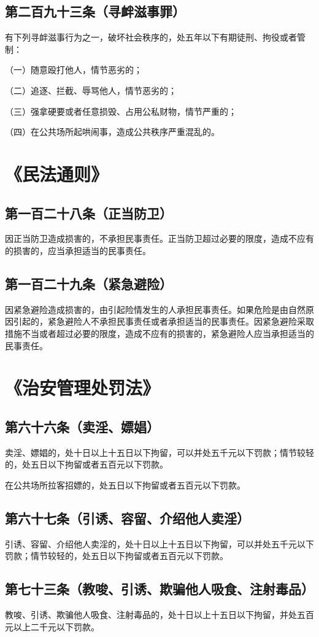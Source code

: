 \documentclass[utf-8,10pt]{ctexart}
\begin{document}
\subsection{第二百九十三条（寻衅滋事罪）}
有下列寻衅滋事行为之一，破坏社会秩序的，处五年以下有期徒刑、拘役或者管制：

（一）随意殴打他人，情节恶劣的；

（二）追逐、拦截、辱骂他人，情节恶劣的；

（三）强拿硬要或者任意损毁、占用公私财物，情节严重的；

（四）在公共场所起哄闹事，造成公共秩序严重混乱的。
\section{《民法通则》}
\subsection{第一百二十八条（正当防卫）}
因正当防卫造成损害的，不承担民事责任。正当防卫超过必要的限度，造成不应有的损害的，应当承担适当的民事责任。
\subsection{第一百二十九条（紧急避险）}
因紧急避险造成损害的，由引起险情发生的人承担民事责任。如果危险是由自然原因引起的，紧急避险人不承担民事责任或者承担适当的民事责任。因紧急避险采取措施不当或者超过必要的限度，造成不应有的损害的，紧急避险人应当承担适当的民事责任。
\section{《治安管理处罚法》}
\subsection{第六十六条（卖淫、嫖娼）}
卖淫、嫖娼的，处十日以上十五日以下拘留，可以并处五千元以下罚款；情节较轻的，处五日以下拘留或者五百元以下罚款。

在公共场所拉客招嫖的，处五日以下拘留或者五百元以下罚款。
\subsection{第六十七条（引诱、容留、介绍他人卖淫）}
引诱、容留、介绍他人卖淫的，处十日以上十五日以下拘留，可以并处五千元以下罚款；情节较轻的，处五日以下拘留或者五百元以下罚款。
\subsection{第七十三条（教唆、引诱、欺骗他人吸食、注射毒品）}
教唆、引诱、欺骗他人吸食、注射毒品的，处十日以上十五日以下拘留，并处五百元以上二千元以下罚款。
\end{document}
